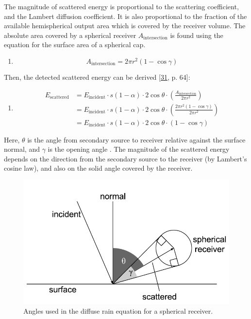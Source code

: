 \documentclass[]{scrreprt}
\providecommand{\tightlist}{%
  \setlength{\itemsep}{0pt}\setlength{\parskip}{0pt}}
\begin{document}
The magnitude of scattered energy is proportional to the scattering
coefficient, and the Lambert diffusion coefficient. It is also
proportional to the fraction of the available hemispherical output area
which is covered by the receiver volume. The absolute area covered by a
spherical receiver \(A_{\text{intersection}}\) is found using the
equation for the surface area of a spherical cap.

\begin{enumerate}
\def\labelenumi{(\arabic{enumi})}
\setcounter{enumi}{44}
\tightlist
\item
  \[A_{\text{intersection}} = 2\pi r^2(1-\cos\gamma)\]
\end{enumerate}

Then, the detected scattered energy can be derived
{[}\protect\hyperlink{ref-schroderux5fphysicallyux5f2011}{31}, p. 64{]}:

\begin{enumerate}
\def\labelenumi{(\arabic{enumi})}
\setcounter{enumi}{45}
\tightlist
\item
  \[ \begin{aligned}
  E_{\text{scattered}} & = E_{\text{incident}} \cdot s(1-\alpha) \cdot 2\cos\theta \cdot \left( \frac{A_{\text{intersection}}}{2\pi r^2} \right) \\
                   & = E_{\text{incident}} \cdot s(1-\alpha) \cdot 2\cos\theta \cdot \left( \frac{2\pi r^2(1-\cos\gamma)}{2\pi r^2} \right) \\
                   & = E_{\text{incident}} \cdot s(1-\alpha) \cdot 2\cos\theta \cdot (1-\cos\gamma)
  \end{aligned}
  \]
\end{enumerate}

Here, \(\theta\) is the angle from secondary source to receiver relative
against the surface normal, and \(\gamma\) is the opening angle
. The magnitude of the scattered energy depends
on the direction from the secondary source to the receiver (by Lambert's
cosine law), and also on the solid angle covered by the receiver.

\begin{figure}[htbp]
\centering
\includegraphics{images/diffuse_rain.pdf}
\caption{Angles used in the diffuse rain equation for a spherical
receiver.\label{fig:diffuse_rain}}
\end{figure}
\end{document}
